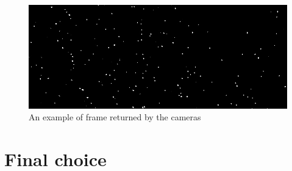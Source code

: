 \begin{figure}[H]
	\centerline{\includegraphics[width=\locateimgsize]{images/locate/_original-frame.png}}
	\caption{\centering An example of frame returned by the cameras}
	\label{fig:locate:original-crop}
\end{figure}


\newpage
 \newpage
 \newpage
 \newpage
 \newpage
 \newpage
 \newpage
 \newpage
 \newpage
 \newpage
 \newpage
 \newpage
 \newpage
 \newpage

\section{Final choice}


